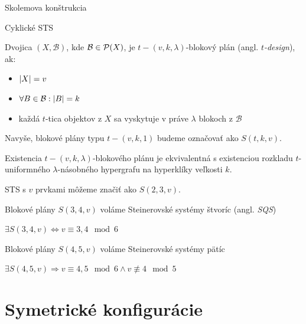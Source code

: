 \TODO Skolemova konštrukcia

\TODO Cyklické STS

\begin{definition}
Dvojica $(X, \mathcal{B})$, kde $\mathcal{B} \in \mathcal{P}(X)$, je $t-(v, k, \lambda)$-blokový plán (angl. \emph{$t$-design}), ak:
\begin{itemize}
    \item $\left|X\right| = v$
    \item $\forall B \in \mathcal{B}: \left|B\right| = k$
    \item každá $t$-tica objektov z $X$ sa vyskytuje v práve $\lambda$ blokoch z $\mathcal{B}$
\end{itemize}

Navyše, blokové plány typu $t-(v,k,1)$ budeme označovať ako $S(t,k,v)$.
\end{definition}

\begin{remark}
Existencia $t-(v,k,\lambda)$-blokového plánu je ekvivalentná s existenciou rozkladu $t$-uniformného $\lambda$-násobného hypergrafu na hyperklíky veľkosti $k$.
\end{remark}

\begin{remark}
STS s $v$ prvkami môžeme značiť ako $S(2,3,v)$.
\end{remark}

\begin{definition}
Blokové plány $S(3,4,v)$ voláme Steinerovské systémy štvoríc (angl. \emph{SQS})
\end{definition}

\begin{theorem_hard}

$\exists S(3,4,v) \Longleftrightarrow v \equiv 3,4 \mod 6$

\end{theorem_hard}


\begin{definition}
Blokové plány $S(4,5,v)$ voláme Steinerovské systémy pätíc
\end{definition}


\begin{theorem_hard}

$\exists S(4,5,v) \Longrightarrow v \equiv 4,5 \mod 6 \wedge v \not\equiv 4 \mod 5$

\end{theorem_hard}

\section{Symetrické konfigurácie}

